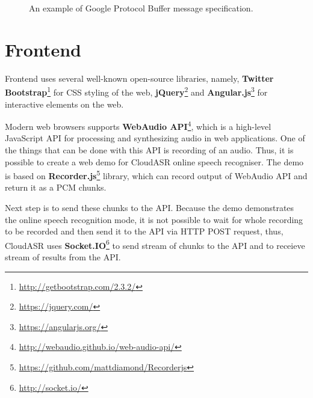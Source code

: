 \begin{figure}
  

  \label{fig:protobuf}
  \caption{An example of Google Protocol Buffer message specification.}
\end{figure}


\section{Frontend}
Frontend uses several well-known open-source libraries, namely,
  \textbf{Twitter Bootstrap}\footnote{\url{http://getbootstrap.com/2.3.2/}} for CSS styling of the web,
  \textbf{jQuery}\footnote{\url{https://jquery.com/}}
  and \textbf{Angular.js}\footnote{\url{https://angularjs.org/}} for interactive elements on the web.


Modern web browsers supports \textbf{WebAudio API}\footnote{\url{http://webaudio.github.io/web-audio-api/}},
  which is a high-level JavaScript API for processing and synthesizing audio in web applications.
One of the things that can be done with this API is recording of an audio.
Thus, it is possible to create a web demo for CloudASR online speech recogniser.
The demo is based on \textbf{Recorder.js}\footnote{\url{https://github.com/mattdiamond/Recorderjs}} library,
  which can record output of WebAudio API and return it as a PCM chunks.

Next step is to send these chunks to the API.
Because the demo demonstrates the online speech recognition mode,
  it is not possible to wait for whole recording to be recorded and then send it to the API via HTTP POST request,
  thus, CloudASR uses \textbf{Socket.IO}\footnote{\url{http://socket.io/}} to send stream of chunks to the API
  and to receieve stream of results from the API.
